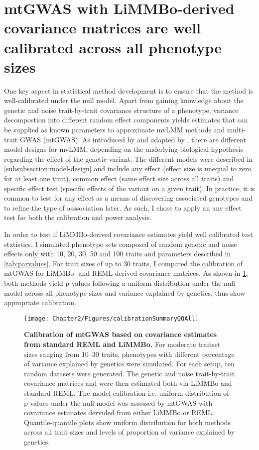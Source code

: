 \section{mtGWAS with LiMMBo-derived covariance matrices are well calibrated across all phenotype sizes}
\label{section:calibration-limmbo}
One key aspect in statistical method development is to ensure that the method is well-calibrated under the null model. Apart from gaining knowledge about the genetic and noise trait-by-trait covariance structure of a phenotype, variance decompostion into different random effect components yields estimates that can be supplied as known parameters to approximate mvLMM methods and multi-trait GWAS (mtGWAS). As introduced by \citet{Jiang1995} and adapted by \citet{Korte2012}, there are different model designs for mvLMM, depending on the underlying biological hypothesis regarding the effect of the genetic variant. The different models were described in \cref{subsubsection:model-design} and include any effect (effect size is unequal to zero for at least one trait), common effect (same effect size across all traits) and specific effect test (specific effects of the variant on a given trait). In practice, it is common to test for any effect as a means of discovering associated genotypes and to refine the type of asssociation later. As such, I chose to apply an any effect test for both the calibration and power analysis.

In order to test if LiMMBo-derived covariance estimates yield well calibrated test statistics, I simulated phenotype sets composed of random genetic and noise effects only with \num{10}, \num{20}, \num{30}, \num{50} and \num{100} traits and parameters described in \cref{tab:parvalues}. For trait sizes of up to \num{30} traits, I compared the calibration of mtGWAS for LiMMBo- and REML-derived covariance matrices. As shown in \cref{fig:calibration}, both methods yield p-values following a uniform distribution under the null model across all phenotype sizes and variance explained by genetics, thus show appropriate calibration. 
%
\begin{figure}[h!]
	\centering	
	\texttt{[image: Chapter2/Figures/calibrationSummaryQQAll]}\\
	\caption[\textbf{Calibration of mtGWAS based on covariance estimates from standard REML and LiMMBo.}]{\textbf{Calibration of mtGWAS based on covariance estimates from standard REML and LiMMBo.} For moderate traitset sizes ranging from \numrange{10}{30} traits, phenotypes with different percentage of variance explained by genetics were simulated. For each setup, ten random datasets were generated. The genetic and noise trait-by-trait covariance matrices  and  were then estimated both via LiMMBo and standard REML. The model calibration i.e. uniform distribution of p-values under the null model was assessed by mtGWAS with covariance estimates dervided from either LiMMBo or REML. Quantile-quantile plots show uniform distribution for both methods across all trait sizes and levels of proportion of variance explained by genetics.}
	  \label{fig:calibration}%
	  \vspace{-2mm}
\end{figure}
%

